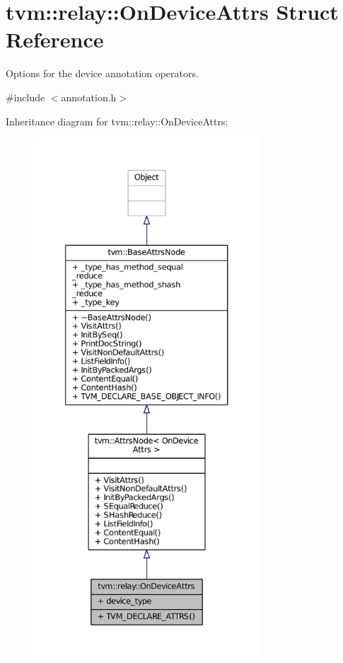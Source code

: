 \hypertarget{structtvm_1_1relay_1_1OnDeviceAttrs}{}\section{tvm\+:\+:relay\+:\+:On\+Device\+Attrs Struct Reference}
\label{structtvm_1_1relay_1_1OnDeviceAttrs}


Options for the device annotation operators.  




{\ttfamily \#include $<$annotation.\+h$>$}



Inheritance diagram for tvm\+:\+:relay\+:\+:On\+Device\+Attrs\+:
\nopagebreak
\begin{figure}[H]
\begin{center}
\leavevmode
\includegraphics[height=550pt]{structtvm_1_1relay_1_1OnDeviceAttrs__inherit__graph}
\end{center}
\end{figure}


